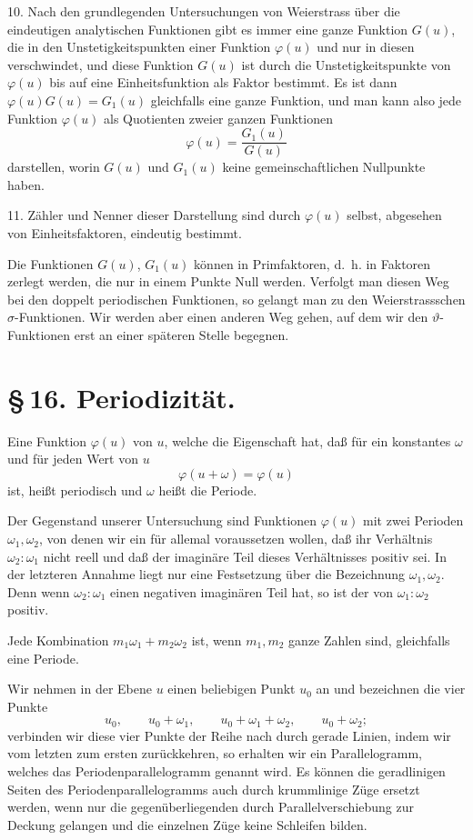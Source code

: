 \documentclass[11pt]{article}
\begin{document}
10. Nach den grundlegenden Untersuchungen von Weierstrass über die eindeutigen analytischen Funktionen gibt es immer eine ganze Funktion $G(u)$, die in den Unstetigkeitspunkten einer Funktion $\varphi(u)$ und nur in diesen verschwindet, und diese Funktion $G(u)$ ist durch die Unstetigkeitspunkte von $\varphi(u)$ bis auf eine Einheitsfunktion als Faktor bestimmt. Es ist dann $\varphi(u)G(u)=G_1(u)$ gleichfalls eine ganze Funktion, und man kann also jede Funktion $\varphi(u)$ als Quotienten zweier ganzen Funktionen
\[
\varphi(u)=\frac{G_1(u)}{G(u)}
\]
darstellen, worin $G(u)$ und $G_1(u)$ keine gemeinschaftlichen Nullpunkte haben.

11. Zähler und Nenner dieser Darstellung sind durch $\varphi(u)$ selbst, abgesehen von Einheitsfaktoren, eindeutig bestimmt.

Die Funktionen $G(u)$, $G_1(u)$ können in Primfaktoren, d.\ h. in Faktoren zerlegt werden, die nur in einem Punkte Null werden. Verfolgt man diesen Weg bei den doppelt periodischen Funktionen, so gelangt man zu den Weierstrassschen $\sigma$-Funktionen. Wir werden aber einen anderen Weg gehen, auf dem wir den $\vartheta$-Funktionen erst an einer späteren Stelle begegnen.

\section*{\S\,16. Periodizität.}

Eine Funktion $\varphi(u)$ von $u$, welche die Eigenschaft hat, daß für ein konstantes $\omega$ und für jeden Wert von $u$
\begin{equation}
\varphi(u+\omega)=\varphi(u)
\tag{1}
\end{equation}
ist, heißt periodisch und $\omega$ heißt die Periode.

Der Gegenstand unserer Untersuchung sind Funktionen $\varphi(u)$ mit zwei Perioden $\omega_1,\omega_2$, von denen wir ein für allemal voraussetzen wollen, daß ihr Verhältnis $\omega_2:\omega_1$ nicht reell und daß der imaginäre Teil dieses Verhältnisses positiv sei. In der letzteren Annahme liegt nur eine Festsetzung über die Bezeichnung $\omega_1,\omega_2$. Denn wenn $\omega_2:\omega_1$ einen negativen imaginären Teil hat, so ist der von $\omega_1:\omega_2$ positiv.

Jede Kombination $m_1\omega_1+m_2\omega_2$ ist, wenn $m_1,m_2$ ganze Zahlen sind, gleichfalls eine Periode.

Wir nehmen in der Ebene $u$ einen beliebigen Punkt $u_0$ an und bezeichnen die vier Punkte
\[
u_0,\qquad u_0+\omega_1,\qquad u_0+\omega_1+\omega_2,\qquad u_0+\omega_2;
\]
verbinden wir diese vier Punkte der Reihe nach durch gerade Linien, indem wir vom letzten zum ersten zurückkehren, so erhalten wir ein Parallelogramm, welches das Periodenparallelogramm genannt wird. Es können die geradlinigen Seiten des Periodenparallelogramms auch durch krummlinige Züge ersetzt werden, wenn nur die gegenüberliegenden durch Parallelverschiebung zur Deckung gelangen und die einzelnen Züge keine Schleifen bilden.
\end{document}

